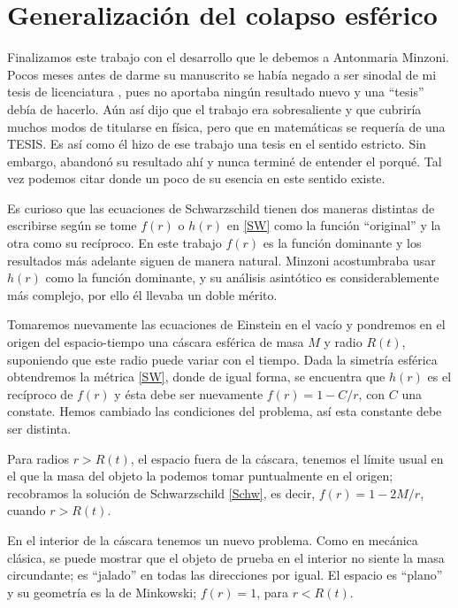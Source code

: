\documentclass[12pt]{article}
\begin{document}





\section{Generalización del colapso esférico}

\noindent
Finalizamos este trabajo con el desarrollo que le debemos a Antonmaria Minzoni. Pocos meses antes de darme su manuscrito se había negado a ser sinodal de mi tesis de licenciatura \cite{Castaneda04}, pues no aportaba ningún resultado nuevo y una ``tesis'' debía de hacerlo. Aún así dijo que el trabajo era sobresaliente y que cubriría muchos modos de titularse en física, pero que en matemáticas se requería de una TESIS. Es así como él hizo de ese trabajo una tesis en el sentido estricto. Sin embargo, abandonó su resultado ahí y nunca terminé de entender el porqué. Tal vez podemos citar \cite{CetA} donde un poco de su esencia en este sentido existe.

Es curioso que las ecuaciones de Schwarzschild tienen dos maneras distintas de escribirse según se tome $f(r)$ o $h(r)$ en \eqref{SW} como la función ``original'' y la otra como su recíproco. En este trabajo $f(r)$ es la función dominante y los resultados más adelante siguen de manera natural. Minzoni acostumbraba usar $h(r)$ como la función dominante, y su análisis asintótico es considerablemente más complejo, por ello él llevaba un doble mérito.

Tomaremos nuevamente las ecuaciones de Einstein en el vacío y pondremos en el origen del espacio-tiempo una cáscara esférica de masa $M$ y radio $R(t)$, suponiendo que este radio puede variar con el tiempo. Dada la simetría esférica obtendremos la métrica \eqref{SW}, donde de igual forma, se encuentra que $h(r)$ es el recíproco de $f(r)$ y ésta debe ser nuevamente $f(r) = 1 - {C}/{r}$, con $C$ una constate. Hemos cambiado las condiciones del problema, así esta constante debe ser distinta.

Para radios $r > R(t)$, el espacio fuera de la cáscara, tenemos el límite usual en el que la masa del objeto la podemos tomar puntualmente en el origen; recobramos la solución de Schwarzschild \eqref{Schw}, es decir, $f(r) = 1 - {2M}/{r}$, cuando $r > R(t)$.

En el interior de la cáscara tenemos un nuevo problema. Como en mecánica clásica, se puede mostrar que el objeto de prueba en el interior no siente la masa circundante; es ``jalado'' en todas las direcciones por igual. El espacio es ``plano'' y su geometría es la de Minkowski; $f(r) = 1$, para $r < R(t)$.
\end{document}
